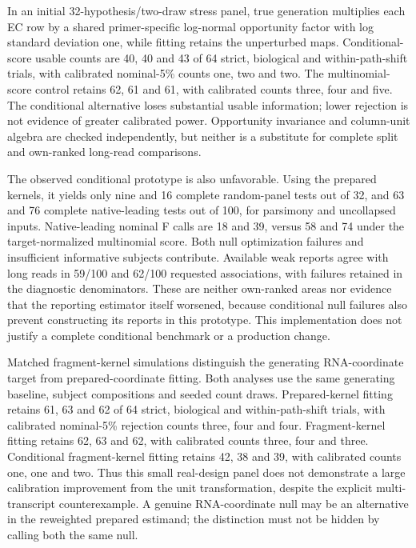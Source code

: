 \documentclass[11pt]{article}
\begin{document}
In an initial 32-hypothesis/two-draw stress panel, true generation multiplies each EC row by a shared primer-specific log-normal opportunity factor with log standard deviation one, while fitting retains the unperturbed maps. Conditional-score usable counts are 40, 40 and 43 of 64 strict, biological and within-path-shift trials, with calibrated nominal-5\% counts one, two and two. The multinomial-score control retains 62, 61 and 61, with calibrated counts three, four and five. The conditional alternative loses substantial usable information; lower rejection is not evidence of greater calibrated power. Opportunity invariance and column-unit algebra are checked independently, but neither is a substitute for complete split and own-ranked long-read comparisons.

The observed conditional prototype is also unfavorable. Using the prepared kernels, it yields only nine and 16 complete random-panel tests out of 32, and 63 and 76 complete native-leading tests out of 100, for parsimony and uncollapsed inputs. Native-leading nominal F calls are 18 and 39, versus 58 and 74 under the target-normalized multinomial score. Both null optimization failures and insufficient informative subjects contribute. Available weak reports agree with long reads in 59/100 and 62/100 requested associations, with failures retained in the diagnostic denominators. These are neither own-ranked areas nor evidence that the reporting estimator itself worsened, because conditional null failures also prevent constructing its reports in this prototype. This implementation does not justify a complete conditional benchmark or a production change.

Matched fragment-kernel simulations distinguish the generating RNA-coordinate target from prepared-coordinate fitting. Both analyses use the same generating baseline, subject compositions and seeded count draws. Prepared-kernel fitting retains 61, 63 and 62 of 64 strict, biological and within-path-shift trials, with calibrated nominal-5\% rejection counts three, four and four. Fragment-kernel fitting retains 62, 63 and 62, with calibrated counts three, four and three. Conditional fragment-kernel fitting retains 42, 38 and 39, with calibrated counts one, one and two. Thus this small real-design panel does not demonstrate a large calibration improvement from the unit transformation, despite the explicit multi-transcript counterexample. A genuine RNA-coordinate null may be an alternative in the reweighted prepared estimand; the distinction must not be hidden by calling both the same null.
\end{document}

